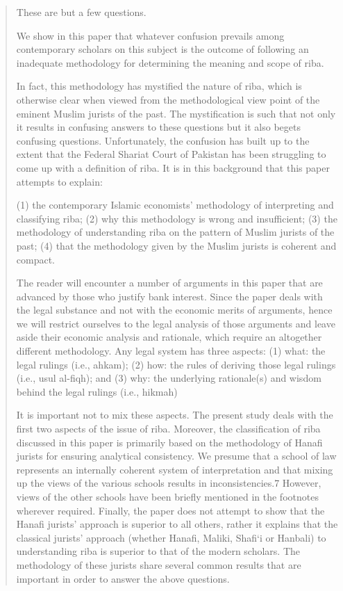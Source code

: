 \begin{quote}
These are but a few questions.
\begin{Synthesis}
We show in this paper that whatever confusion prevails among contemporary scholars on this subject is the outcome of following an inadequate methodology for determining the meaning and scope of riba.
\end{Synthesis}
 In fact, this methodology has mystified the nature of riba, which is otherwise clear when viewed from the methodological view point of the eminent Muslim jurists of the past. The mystification is such that not only it results in confusing answers to these questions but it also begets confusing questions. Unfortunately, the confusion has built up to the extent that the Federal Shariat Court of Pakistan has been struggling to come up with a definition of riba. It is in this background that this paper attempts to explain:

(1) the contemporary Islamic economists' methodology of interpreting and classifying riba; (2) why this methodology is wrong and insufficient; (3) the methodology of understanding riba on the pattern of Muslim jurists of the past; (4) that the methodology given by the Muslim jurists is coherent and compact.

The reader will encounter a number of arguments in this paper that are advanced by those who justify bank interest. Since the paper deals with the legal substance and not with the economic merits of arguments, hence we will restrict ourselves to the legal analysis of those arguments and leave aside their economic analysis and rationale, which require an altogether different methodology. Any legal system has three aspects: (1) what: the legal rulings (i.e., ahkam); (2) how: the rules of deriving those legal rulings (i.e., usul al-fiqh); and (3) why: the underlying rationale(s) and wisdom behind the legal rulings (i.e., hikmah)

It is important not to mix these aspects. The present study deals with the first two aspects of the issue of riba. Moreover, the classification of riba discussed in this paper is primarily based on the methodology of Hanafi jurists for ensuring analytical consistency. We presume that a school of law represents an internally coherent system of interpretation and that mixing up the views of the various schools results in inconsistencies.7 However, views of the other schools have been briefly mentioned in the footnotes wherever required. Finally, the paper does not attempt to show that the Hanafi jurists' approach is superior to all others, rather it explains that the classical jurists' approach (whether Hanafi, Maliki, Shafi‘i or Hanbali) to understanding riba is superior to that of the modern scholars. The methodology of these jurists share several common results that are important in order to answer the above questions.


\end{quote}
